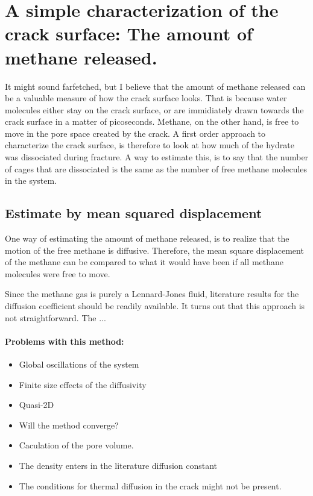 \section{A simple characterization of the crack surface: The amount of methane released.}
It might sound farfetched, but I believe that the amount of methane released can be a valuable measure of how the crack surface looks. That is because water molecules either stay on the crack surface, or are immidiately drawn towards the crack surface in a matter of picoseconds. Methane, on the other hand, is free to move in the pore space created by the crack. A first order approach to characterize the crack surface, is therefore to look at how much of the hydrate was dissociated during fracture. A way to estimate this, is to say that the number of cages that are dissociated is the same as the number of free methane molecules in the system.  

\subsection{Estimate by mean squared displacement}
One way of estimating the amount of methane released, is to realize that the motion of the free methane is diffusive. Therefore, the mean square displacement of the methane can be compared to what it would have been if all methane molecules were free to move.

Since the methane gas is purely a Lennard-Jones fluid, literature results for the diffusion coefficient should be readily available. It turns out that this approach is not straightforward. The ...

\paragraph{Problems with this method:}
\begin{itemize}
\item Global oscillations of the system
\item Finite size effects of the diffusivity
\item Quasi-2D
\item Will the method converge?
\item Caculation of the pore volume.
\item The density enters in the literature diffusion constant
\item The conditions for thermal diffusion in the crack might not be present. 
\end{itemize}

